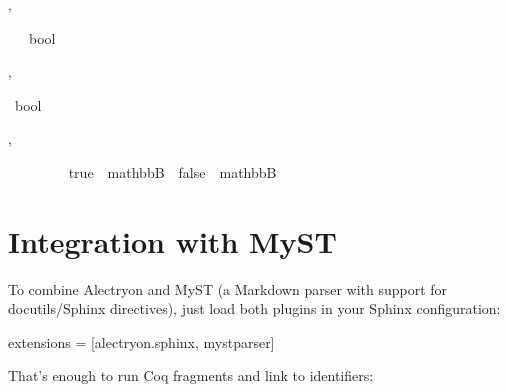 \documentclass[letterpaper,10pt,english]{sphinxmanual}
\begin{document}
\begin{itemize}
\begin{alectryon}
  \sep
  \begin{sentence}
    \begin{input}
      ~~~bool\nl
    \end{input}
  \end{sentence}
  \sep
  \begin{sentence}
    \begin{input}
      ~bool
    \end{input}
    \sep
    \begin{output}
      \begin{messages}
        \begin{message}
          ~~~~\nl
          ~~~~true~~mathbbB~~false~~mathbbB
        \end{message}
      \end{messages}
    \end{output}
  \end{sentence}
\end{alectryon}

\end{itemize}


\chapter{Integration with MyST}
\label{\detokenize{MyST:integration-with-myst}}\label{\detokenize{MyST::doc}}
\sphinxAtStartPar
To combine Alectryon and MyST (a Markdown parser with support for docutils/Sphinx directives), just load both plugins in your Sphinx configuration:

\begin{sphinxVerbatim}[commandchars=\\\{\}]
extensions = [\PYGZdq{}alectryon.sphinx\PYGZdq{}, \PYGZdq{}myst\PYGZus{}parser\PYGZdq{}]
\end{sphinxVerbatim}

\sphinxAtStartPar
That’s enough to run Coq fragments and link to identifiers:
\end{document}
